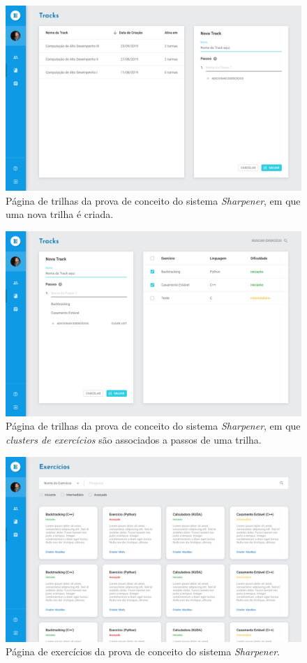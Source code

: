   \begin{figure}[htpb]
  \centering
  \includegraphics[width=\linewidth]{images/mocks/trackAdd1.png}
  \caption{Página de trilhas da prova de conceito do sistema \emph{Sharpener}, 
  em que uma nova trilha é criada.}%
  \label{fig:add_track1}
  \end{figure}

  \begin{figure}[htpb]
  \centering
  \includegraphics[width=\linewidth]{images/mocks/trackAdd4.png}
  \caption{Página de trilhas da prova de conceito do sistema \emph{Sharpener}, 
	  em que \emph{clusters de exercícios} são associados a passos de uma trilha.}%
  \label{fig:add_track4}
  \end{figure}

\begin{figure}[htpb]
  \centering
  \includegraphics[width=\linewidth]{images/mocks/exercicios.png}
  \caption{Página de exercícios da prova de conceito do sistema \emph{Sharpener}.}%
  \label{fig:exercicios}
  \end{figure}
